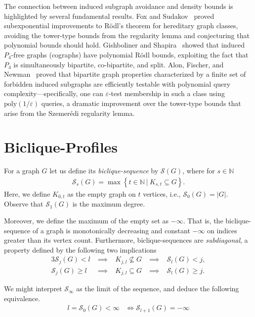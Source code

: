 \documentclass{article}
\newcommand{\NN}{\mathbb{N}}
\theoremstyle{definition}
\theoremstyle{definition}
\theoremstyle{definition}
\theoremstyle{definition}
\theoremstyle{definition}
\theoremstyle{definition}
\theoremstyle{definition}
\theoremstyle{definition}
\theoremstyle{definition}
\theoremstyle{definition}
\begin{document}
The connection between induced subgraph avoidance and density bounds is highlighted by several fundamental results.
Fox and Sudakov~\cite{FoxSudakov2007} proved subexponential improvements to R\"odl's theorem for hereditary graph classes, avoiding the tower-type bounds from the regularity lemma and conjecturing that polynomial bounds should hold.
Gishboliner and Shapira~\cite{Gishboliner2023} showed that induced $P_4$-free graphs (cographs) have polynomial R\"odl bounds, exploiting the fact that $P_4$ is simultaneously bipartite, co-bipartite, and split.
Alon, Fischer, and Newman~\cite{Alon2007} proved that bipartite graph properties characterized by a finite set of forbidden induced subgraphs are efficiently testable with polynomial query complexity---specifically, one can $\varepsilon$-test membership in such a class using $\text{poly}(1/\varepsilon)$ queries, a dramatic improvement over the tower-type bounds that arise from the Szemer\'edi regularity lemma.


\section{Biclique-Profiles} \label{sec:biclique_profiles}

For a graph $G$ let us define its \emph{biclique-sequence} by $\mathscr{S}(G)$, where for $s \in \NN$
\begin{align}
    \mathscr{S}_s(G) = \max \left\{ t \in \NN \ | \ K_{s,t} \subseteq G \right\}.
\end{align}
Here, we define $K_{0,t}$ as the empty graph on $t$ vertices, i.e., $\mathscr{S}_0(G) = |G|$. Observe that $\mathscr{S}_1(G)$ is the maximum degree.

Moreover, we define the maximum of the empty set as $-\infty$.
That is, the biclique-sequence of a graph is monotonically decreasing and constant $-\infty$ on indices greater than its vertex count. Furthermore, biclique-sequences are \emph{subdiagonal}, a property defined by the following two implications
\begin{alignat}{3}
    \mathscr{S}_{j}(G) < l
    &\;\implies\;& K_{j, l} \nsubseteq G
    &\;\implies\;& \mathscr{S}_{l}(G) < j \label{eq:subdiagonal_1},\\
    \mathscr{S}_{j}(G) \geq l
    &\;\implies\;& K_{j, l} \subseteq G
    &\;\implies\;& \mathscr{S}_{l}(G) \geq j \label{eq:subdiagonal_2}.
\end{alignat}

We might interpret $\mathscr{S}_{\infty}$ as the limit of the sequence, and deduce the following equivalence.
\begin{align}
    l = \mathscr{S}_{0}(G) < \infty &\iff \mathscr{S}_{l+1}(G) = -\infty \label{eq:finite_vertices_sequence}
\end{align}
\end{document}
